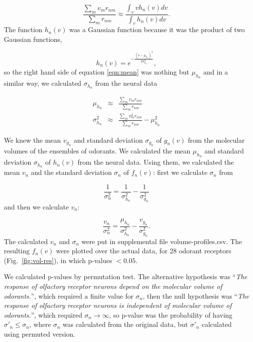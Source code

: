 \documentclass[11pt]{paper} %
\newcommand{\numberofreceptors}{ 28 }
\begin{document}
\begin{equation}
	\frac{\displaystyle \sum_{m} v_m r_{nm}}{\displaystyle \sum_{m} r_{nm}} \approx \frac{\displaystyle \int_v v h_n(v) dv}{ \displaystyle \int_v  h_n(v) dv }.
	\label{eqn:mean}
\end{equation}
The function $h_n(v)$ was a Gaussian function because it was the product of two Gaussian functions, 

\begin{equation}
h_n(v) = e^{-\frac{(v-\mu_{h_n})^2}{2\sigma_{h_n}^2}}, 
\end{equation}
so the right hand side of equation \ref{eqn:mean} was nothing but $\mu_{h_n}$ and 
in a similar way, we calculated $\sigma_{h_n}$ from the neural data

\begin{eqnarray}
	\mu_{h_n} &\approx& \frac{\displaystyle \sum_{m} v_m r_{nm}}{\displaystyle \sum_{m} r_{nm}} \\
	\sigma_{h_n}^2 &\approx& \frac{\displaystyle \sum_{m} v_m^2 r_{nm}}{\displaystyle \sum_{m} r_{nm}} - \mu_{h_n}^2
	\label{eqn:final_h}
\end{eqnarray}


We knew the mean $v_{g_n}$ and standard deviation $\sigma_{g_n}$ of $g_n(v)$ from the molecular volumes of the ensembles of odorants. 
We calculated the mean $\mu_{h_n}$ and standard deviation $\sigma_{h_n}$ of $h_n(v)$ from the neural data.
Using them, we calculated the mean $v_n$ and the standard deviation $\sigma_n$ of $f_n(v)$:
first we calculate $\sigma_n$ from 

\begin{equation}
	\frac{1}{\sigma_n^2} = \frac{1}{\sigma^2_{h_n}}  - \frac{1}{\sigma^2_{g_n}}
\end{equation}
and then we calculate $v_n$: 

\begin{equation}
	\frac{v_n}{\sigma_n^2}  =    \frac{\mu_{h_n}}{\sigma^2_{h_n}} - \frac{v_{g_n}}{\sigma^2_{g_n}}.
\end{equation}
The calculated $v_n$ and $\sigma_n$ were put in supplemental file volume-profiles.csv. 
The resulting $f_n(v)$ were plotted over the actual data, for \numberofreceptors odorant receptors (Fig.~\ref{fig:vol-res}),
in which p-values $<0.05$. 

We calculated p-values by permutation test. 
The alternative hypothesis was
``{\it The response of olfactory receptor neurons depend on the molecular volume of odorants.}'', 
which required  a finite value for $\sigma_n$, 
then the null hypothesis was 
``{\it The response of olfactory receptor neurons is independent of molecular volume of odorants.}'',
which required $\sigma_n \rightarrow \infty$, 
so p-value was the probability of having $\sigma'_n\leq\sigma_n$, 
where $\sigma_n$ was calculated from the original data, but $\sigma'_n$ calculated using permuted version.
\end{document}

